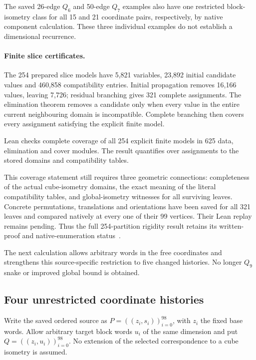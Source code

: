 \documentclass[11pt,a4paper]{article}
\theoremstyle{definition}
\theoremstyle{remark}
\begin{document}
The saved 26-edge $Q_6$ and 50-edge $Q_7$ examples also have
one restricted block-isometry class for all 15 and 21 coordinate
pairs, respectively, by native component calculation. These three
individual examples do not establish a dimensional recurrence.

\paragraph{Finite slice certificates.}
The 254 prepared slice models have 5,821 variables, 23,892 initial
candidate values and 460,858 compatibility entries. Initial
propagation removes 16,166 values, leaving 7,726; residual branching
gives 321 complete assignments. The elimination theorem removes
a candidate only when every value in the entire current neighbouring
domain is incompatible. Complete branching then covers every
assignment satisfying the explicit finite model.

Lean checks complete coverage of all 254 explicit finite models in 625
data, elimination and cover modules. The result quantifies over assignments
to the stored domains and compatibility tables.

This coverage statement still requires three geometric connections:
completeness of the actual cube-isometry domains, the exact meaning
of the literal compatibility tables, and global-isometry witnesses
for all surviving leaves. Concrete permutations, translations and
orientations have been saved for all 321 leaves and compared
natively at every one of their 99 vertices. Their Lean replay
remains pending. Thus the full 254-partition rigidity result retains
its written-proof and native-enumeration status~\cite{research205}.

The next calculation allows arbitrary words in the free coordinates
and strengthens this source-specific restriction to five changed
histories. No longer $Q_9$ snake or improved global bound is obtained.

\subsection{Four unrestricted coordinate histories}
\label{sec:history206}
Write the saved ordered source as $P=((z_i,s_i))_{i=0}^{98}$,
with $z_i$ the fixed base words. Allow arbitrary target block words
$u_i$ of the same dimension and put $Q=((z_i,u_i))_{i=0}^{98}$.
No extension of the selected correspondence to a cube isometry
is assumed.
\end{document}
